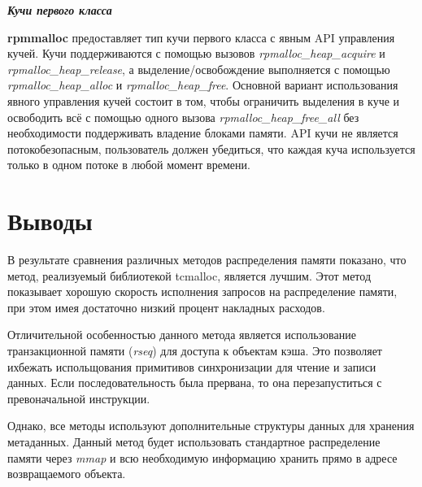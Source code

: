 \bigbreak
\textit{\textbf{Кучи первого класса}}

\textbf{rpmmalloc} предоставляет тип кучи первого класса с явным API управления кучей. Кучи поддерживаются с помощью вызовов \textit{rpmalloc\_heap\_acquire} и \textit{rpmalloc\_heap\_release}, а выделение/освобождение выполняется с помощью \textit{rpmalloc\_heap\_alloc} и \textit{rpmalloc\_heap\_free}. Основной вариант использования явного управления кучей состоит в том, чтобы ограничить выделения в куче и освободить всё с помощью одного вызова \textit{rpmalloc\_heap\_free\_all} без необходимости поддерживать владение блоками памяти. API кучи не является потокобезопасным, пользователь должен убедиться, что каждая куча используется только в одном потоке в любой момент времени.

\section{Выводы}
В результате сравнения различных методов распределения памяти показано, что метод, реализуемый библиотекой tcmalloc, является лучшим. Этот метод показывает хорошую скорость исполнения запросов на распределение памяти, при этом имея достаточно низкий процент накладных расходов.

Отличительной особенностью данного метода является использование транзакционной памяти (\textit{rseq}) для доступа к объектам кэша. Это позволяет ихбежать испольщования примитивов синхронизации для чтение и записи данных. Если последовательность была прервана, то она перезапуститься с превоначальной инструкции.

Однако, все методы используют дополнительные структуры данных для хранения метаданных. Данный метод будет использовать стандартное распределение памяти через \textit{mmap} и всю необходимую информацию хранить прямо в адресе возвращаемого объекта.

